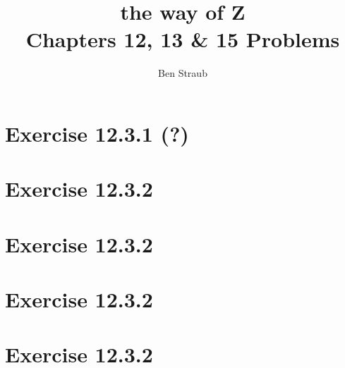 \documentclass[10pt]{article}
\begin{document}
\title{the way of Z \\ Chapters 12, 13 \& 15 Problems}
\author{Ben Straub}
\maketitle

\section{Exercise 12.3.1 (?)}
\begin{quote}
  {\it {} }
\end{quote}



\section{Exercise 12.3.2}
\begin{quote}
  {\it  }
\end{quote}


\section{Exercise 12.3.2}
\begin{quote}
  {\it }
\end{quote}



\section{Exercise 12.3.2}
\begin{quote}
  {\it }
\end{quote}



\section{Exercise 12.3.2}
\begin{quote}
  {\it }
\end{quote}
\end{document}
